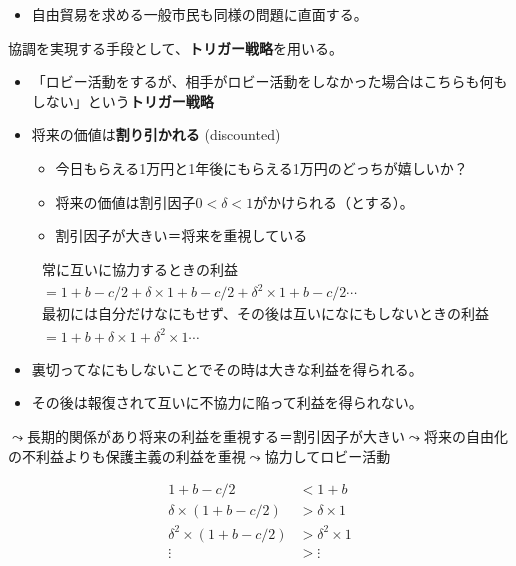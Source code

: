 \documentclass[
  xelatex,
  ja=standard]{bxjsarticle}
\providecommand{\tightlist}{%
  \setlength{\itemsep}{0pt}\setlength{\parskip}{0pt}}\usepackage{longtable,booktabs,array}
\begin{document}
\begin{itemize}
\tightlist
\item
  自由貿易を求める一般市民も同様の問題に直面する。
\end{itemize}

協調を実現する手段として、\textbf{トリガー戦略}を用いる。

\begin{itemize}
\tightlist
\item
  「ロビー活動をするが、相手がロビー活動をしなかった場合はこちらも何もしない」という\textbf{トリガー戦略}
\item
  将来の価値は\textbf{割り引かれる} (discounted)

  \begin{itemize}
  \tightlist
  \item
    今日もらえる1万円と1年後にもらえる1万円のどっちが嬉しいか？
  \item
    将来の価値は割引因子\(0 < \delta < 1\)がかけられる（とする）。
  \item
    割引因子が大きい＝将来を重視している
  \end{itemize}
\end{itemize}

\[
\begin{split}
&\textrm{常に互いに協力するときの利益} \\
&= 1+b-c/2 + \delta \times 1+b-c/2 + \delta^2 \times 1+b-c/2 \cdots \\
&\textrm{最初には自分だけなにもせず、その後は互いになにもしないときの利益} \\
&= 1+b + \delta \times 1 + \delta^2 \times 1 \cdots
\end{split}
\]

\begin{itemize}
\tightlist
\item
  裏切ってなにもしないことでその時は大きな利益を得られる。
\item
  その後は報復されて互いに不協力に陥って利益を得られない。
\end{itemize}

\(\leadsto\)長期的関係があり将来の利益を重視する＝割引因子が大きい\(\leadsto\)将来の自由化の不利益よりも保護主義の利益を重視\(\leadsto\)協力してロビー活動

\[
\begin{split}
1+b-c/2 &< 1+b \\
\delta \times (1+b-c/2) &> \delta \times 1 \\
\delta^2 \times (1+b-c/2) &> \delta^2 \times 1 \\
\vdots &> \vdots 
\end{split}
\]
\end{document}
